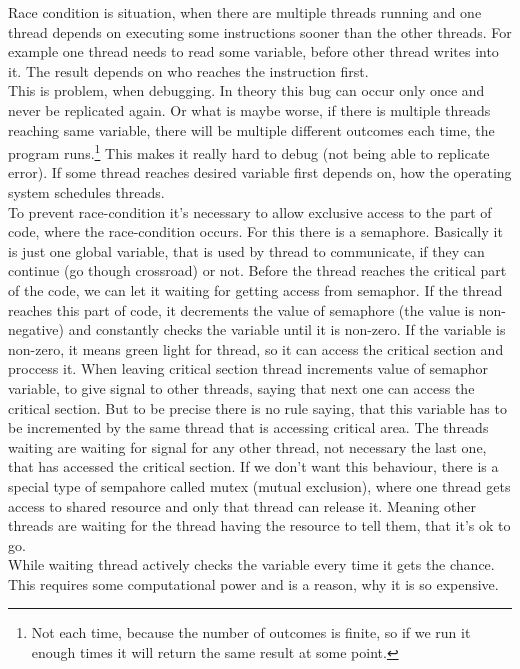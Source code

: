 \documentclass[a4paper]{article}
\begin{document}
Race condition is situation, when there are multiple threads running and one thread
depends on executing some instructions sooner than the other threads. For example 
one thread needs to read some variable, before other thread writes into it. The result
depends on who reaches the instruction first. \\
This is problem, when debugging. In theory this bug can occur only once and never be replicated
again. Or what is maybe worse, if there is multiple threads reaching same variable,
there will be multiple different outcomes each time, the program runs.\footnote{Not 
each time, because the number of outcomes is finite, so if we run it enough times
it will return the same result at some point.}
This makes it really hard to debug (not being able to replicate error). If some thread 
reaches desired variable first depends on, how the operating system schedules threads. \\
To prevent race-condition it's necessary to allow exclusive access to the part of code,
where the race-condition occurs. For this there is a semaphore. Basically it is just
one global variable, that is used by thread to communicate, if they can continue (go
though crossroad) or not. Before the thread reaches the critical part of the code,
we can let it waiting for getting access from semaphor. If the thread reaches this part
of code, it decrements the value of semaphore (the value is non-negative) and constantly
checks the variable until it is non-zero. If the variable is non-zero, it means green light
for thread, so it can access the critical section and proccess it. When leaving critical section 
thread increments value of semaphor variable, to give signal to other threads, saying that next 
one can access the critical section. But to be precise there is no rule saying, that this
variable has to be incremented by the same thread that is accessing critical area. The threads
waiting are waiting for signal for any other thread, not necessary the last one, that has accessed
the critical section. If we don't want this behaviour, there is a special type of sempahore called
mutex (mutual exclusion), where one thread gets access to shared resource and only that thread
can release it. Meaning other threads are waiting for the thread having the resource to tell
them, that it's ok to go.
\\
While waiting thread actively checks the variable every time it gets the chance. This 
requires some computational power and is a reason, why it is so expensive.
\end{document}
